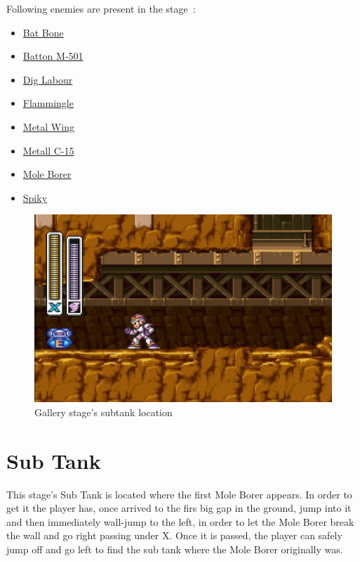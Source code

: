 Following enemies are present in the stage~\cite{wiki:Gallery}:
\begin{itemize}
	\item \hyperlink{enem:Batton_Bone}{Bat Bone} 
	\item \hyperlink{enem:Batton_M-501}{Batton M-501} 
	\item \hyperlink{enem:Dig_Labour}{Dig Labour} 
	\item \hyperlink{enem:Flammingle}{Flammingle} 
	\item \hyperlink{enem:Metal_Wing}{Metal Wing} 
	\item \hyperlink{enem:Metall_C-15}{Metall C-15} 
	\item \hyperlink{miniboss:Mole_Borer}{Mole Borer}
	\item \hyperlink{enem:Spiky}{Spiky}
\end{itemize}
\begin{figure}[htp]
	\centering
	\includegraphics[width=0.5\linewidth]{figures/X1/Armored_armadillo/Armadillo_tank.jpg}
	\caption{Gallery stage's subtank location}
\end{figure}
\section{Sub Tank}
This stage's Sub Tank is located where the first Mole Borer appears. In order to get it the player has, once arrived to the firs big gap in the ground, jump into it and then immediately wall-jump to the left, in order to let the Mole Borer break the wall and go right passing under X. Once it is passed, the player can safely jump off and go left to find the sub tank where the Mole Borer originally was. 


